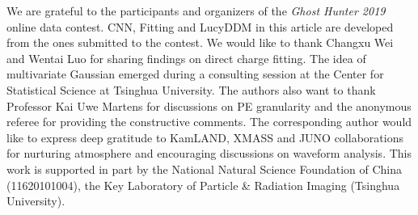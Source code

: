 \acknowledgments
We are grateful to the participants and organizers of the \textit{Ghost Hunter 2019} online data contest.  CNN, Fitting and LucyDDM in this article are developed from the ones submitted to the contest.  We would like to thank Changxu Wei and Wentai Luo for sharing findings on direct charge fitting.  The idea of multivariate Gaussian emerged during a consulting session at the Center for Statistical Science at Tsinghua University.  The authors also want to thank Professor Kai Uwe Martens for discussions on PE granularity and the anonymous referee for providing the constructive comments.  The corresponding author would like to express deep gratitude to KamLAND, XMASS and JUNO collaborations for nurturing atmosphere and encouraging discussions on waveform analysis.  This work is supported in part by the National Natural Science Foundation of China (11620101004), the Key Laboratory of Particle \& Radiation Imaging (Tsinghua University). 

